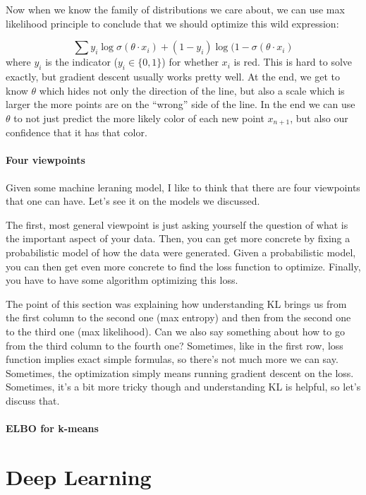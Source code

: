 \documentclass{article}
\begin{document}
Now when we know the family of distributions we care about, we can use max likelihood principle to conclude that we should optimize this wild expression: 

\[
\sum y_i \log \sigma(\theta\cdot x_i) + (1-y_i)\log (1-\sigma(\theta\cdot x_i)
\]
where $y_i$ is the indicator ($y_i \in \{0,1\}$) for whether $x_i$ is red. This is hard to solve exactly, but gradient descent usually works pretty well. At the end, we get to know $\theta$ which hides not only the direction of the line, but also a scale which is larger the more points are on the ``wrong'' side of the line. In the end we can use $\theta$ to not just predict the more likely color of each new point $x_{n+1}$, but also our confidence that it has that color. 



\paragraph{Four viewpoints}
Given some machine leraning model, I like to think that there are four viewpoints that one can have. Let's see it on the models we discussed. 

The first, most general viewpoint is just asking yourself the question of what is the important aspect of your data. Then, you can get more concrete by fixing a probabilistic model of how the data were generated. Given a probabilistic model, you can then get even more concrete to find the loss function to optimize. Finally, you have to have some algorithm optimizing this loss. 

The point of this section was explaining how understanding KL brings us from the first column to the second one (max entropy) and then from the second one to the third one (max likelihood). Can we also say something about how to go from the third column to the fourth one? Sometimes, like in the first row, loss function implies exact simple formulas, so there's not much more we can say. Sometimes, the optimization simply means running gradient descent on the loss. Sometimes, it's a bit more tricky though and understanding KL is helpful, so let's discuss that. 

\paragraph{ELBO for k-means}



\section{Deep Learning}
\end{document}
